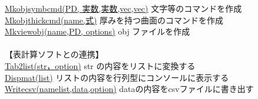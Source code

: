 \documentclass[papersize,a4paper,12pt,uplatex]{jsarticle}
\begin{document}
\begin{tabbing}
\hyperlink{mkobjsymbcmd}{Mkobjsymbcmd(PD, 実数,実数,vec,vec)} \>文字等のコマンドを作成\\
\hyperlink{mkobjthickcmd}{Mkobjthickcmd(name,式)} \>厚みを持つ曲面のコマンドを作成\\
\hyperlink{mkviewobj}{Mkviewobj(name,PD, options)} \>obj ファイルを作成\\
　\\
【表計算ソフトとの連携】\\
\hyperlink{tab2list}{Tab2list(str，option)}  \>str の内容をリストに変換する\\
\hyperlink{dispmat}{Dispmat(list)}  \>リストの内容を行列型にコンソールに表示する\\
\hyperlink{writecsv}{Writecsv(namelist,data,option)}  \>dataの内容をcsvファイルに書き出す\\
 \\


\end{tabbing}
\end{document}
